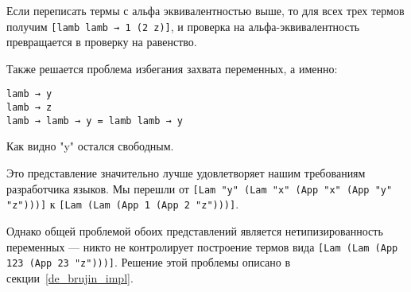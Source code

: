 Если переписать термы с альфа эквивалентностью выше, то для всех трех термов получим \lstinline{[lamb lamb → 1 (2 z)]}, и проверка на альфа-эквивалентность превращается в проверку на равенство.

Также решается проблема избегания захвата переменных, а именно:
\begin{lstlisting}
lamb → y
lamb → z
lamb → lamb → y = lamb lamb → y
\end{lstlisting}

Как видно "y" остался свободным.

Это представление значительно лучше удовлетворяет нашим требованиям разработчика языков. Мы перешли от
\lstinline{[Lam "y" (Lam "x" (App "x" (App "y" "z")))]} к \lstinline{[Lam (Lam (App 1 (App 2 "z")))]}.

Однако общей проблемой обоих представлений является нетипизированность переменных --- никто не контролирует построение термов вида \lstinline{[Lam (Lam (App 123 (App 23 "z")))]}. Решение этой проблемы описано в секции~\ref{de_brujin_impl}.










